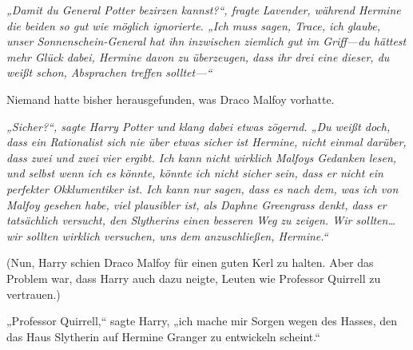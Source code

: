 \emph{„Damit du General Potter bezirzen kannst?“, fragte Lavender, während Hermine die beiden so gut wie möglich ignorierte. „Ich muss sagen, Trace, ich glaube, unser Sonnenschein-General hat ihn inzwischen ziemlich gut im Griff—du hättest mehr Glück dabei, Hermine davon zu überzeugen, dass ihr drei eine dieser, du weißt schon, Absprachen treffen solltet—“}

Niemand hatte bisher herausgefunden, was Draco Malfoy vorhatte.

\emph{„Sicher?“, sagte Harry Potter und klang dabei etwas zögernd. „Du weißt doch, dass ein Rationalist sich nie über etwas sicher ist Hermine, nicht einmal darüber, dass zwei und zwei vier ergibt. Ich kann nicht wirklich Malfoys Gedanken lesen, und selbst wenn ich es könnte, könnte ich nicht sicher sein, dass er nicht ein perfekter Okklumentiker ist. Ich kann nur sagen, dass es nach dem, was ich von Malfoy gesehen habe, viel plausibler ist, als Daphne Greengrass denkt, dass er tatsächlich versucht, den Slytherins einen besseren Weg zu zeigen. Wir sollten… wir sollten wirklich versuchen, uns dem anzuschließen, Hermine.“}

(Nun, Harry schien Draco Malfoy für einen guten Kerl zu halten. Aber das Problem war, dass Harry auch dazu neigte, Leuten wie Professor Quirrell zu vertrauen.)

\later

„Professor Quirrell,“ sagte Harry, „ich mache mir Sorgen wegen des Hasses, den das Haus Slytherin auf Hermine Granger zu entwickeln scheint.“

